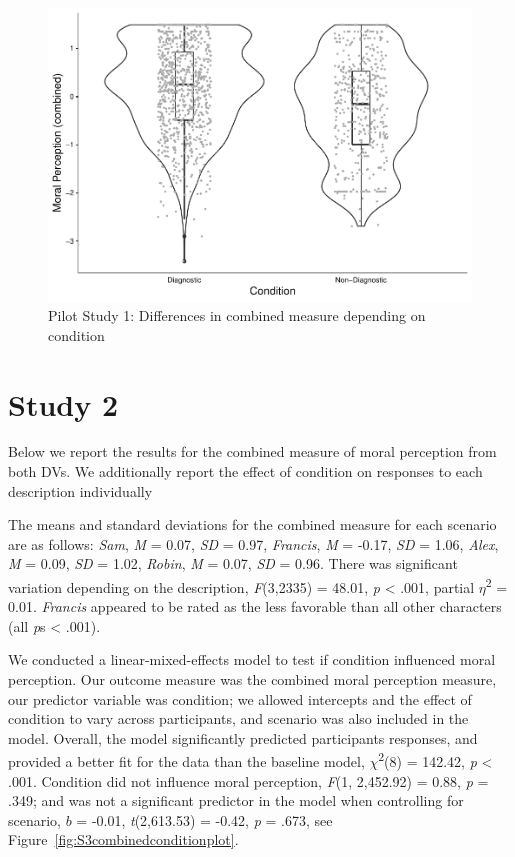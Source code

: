 \documentclass[
  american,
  man,floatsintext]{apa7}
\begin{document}
\begin{figure}[!h]
\includegraphics[width=\textwidth,]{Supplementary_files/figure-latex/pilot2cobminedconditionplot-1} \caption{Pilot Study 1: Differences in combined measure depending on condition}\label{fig:pilot2cobminedconditionplot}
\end{figure}

\newpage

\hypertarget{study-2}{%
\section{Study 2}\label{study-2}}

Below we report the results for the combined measure of moral perception from both DVs. We additionally report the effect of condition on responses to each description individually

The means and standard deviations for the combined measure for each scenario are as follows:
\emph{Sam},
\emph{M} = 0.07, \emph{SD} = 0.97,
\emph{Francis},
\emph{M} = -0.17, \emph{SD} = 1.06,
\emph{Alex},
\emph{M} = 0.09, \emph{SD} = 1.02,
\emph{Robin},
\emph{M} = 0.07, \emph{SD} = 0.96. There was significant variation depending on the description, \emph{F}(3,2335) = 48.01, \emph{p} \textless{} .001, partial \(\eta\)\textsuperscript{2} = 0.01. \emph{Francis} appeared to be rated as the less favorable than all other characters (all \emph{p}s \textless{} .001).

We conducted a linear-mixed-effects model to test if condition influenced moral perception. Our outcome measure was the combined moral perception measure, our predictor variable was condition; we allowed intercepts and the effect of condition to vary across participants, and scenario was also included in the model.
Overall, the model significantly predicted participants responses, and provided a better fit for the data than the baseline model, \(\chi\)\textsuperscript{2}(8) = 142.42, \emph{p} \textless{} .001. Condition did not influence moral perception, \emph{F}(1, 2,452.92) = 0.88, \emph{p} = .349; and was not a significant predictor in the model when controlling for scenario, \(b\) = -0.01, \emph{t}(2,613.53) = -0.42, \emph{p} = .673, see Figure~\ref{fig:S3combinedconditionplot}.
\end{document}
